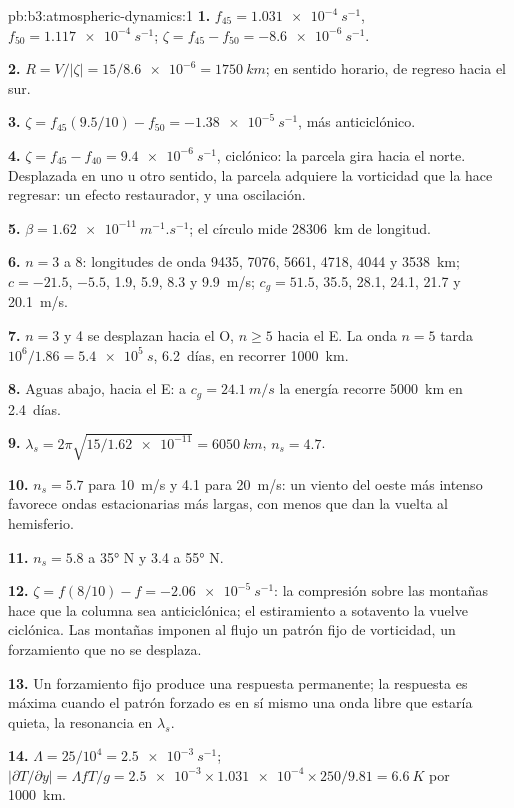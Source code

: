 \begin{solution}{pb:b3:atmospheric-dynamics:1}
\textbf{1.} $f_{45} = \qty{1.031e-4}{s^{-1}}$, $f_{50} =
\qty{1.117e-4}{s^{-1}}$; $\zeta = f_{45} - f_{50} = \qty{-8.6e-6}{s^{-1}}$.

\textbf{2.} $R = V/|\zeta| = 15/\num{8.6e-6} = \qty{1750}{km}$; en sentido horario,
de regreso hacia el sur.

\textbf{3.} $\zeta = f_{45}(9.5/10) - f_{50} = \qty{-1.38e-5}{s^{-1}}$, más
anticiclónico.

\textbf{4.} $\zeta = f_{45} - f_{40} = \qty{+9.4e-6}{s^{-1}}$, ciclónico: la parcela
gira hacia el norte. Desplazada en uno u otro sentido, la parcela adquiere la vorticidad
que la hace regresar: un efecto restaurador, y una oscilación.

\textbf{5.} $\beta = \qty{1.62e-11}{m^{-1}.s^{-1}}$; el círculo mide
\qty{28306}{km} de longitud.

\textbf{6.} $n = 3$ a 8: longitudes de onda 9435, 7076, 5661, 4718, 4044 y
\qty{3538}{km}; $c = -21.5$, $-5.5$, 1.9, 5.9, 8.3 y \qty{9.9}{m/s}; $c_g
= 51.5$, 35.5, 28.1, 24.1, 21.7 y \qty{20.1}{m/s}.

\textbf{7.} $n = 3$ y 4 se desplazan hacia el O, $n \ge 5$ hacia el E. La onda $n = 5$ tarda
$10^6/1.86 = \qty{5.4e5}{s}$, \num{6.2}~días, en recorrer \qty{1000}{km}.

\textbf{8.} Aguas abajo, hacia el E: a $c_g = \qty{24.1}{m/s}$ la energía recorre
\qty{5000}{km} en \num{2.4}~días.

\textbf{9.} $\lambda_s = 2\pi\sqrt{15/\num{1.62e-11}} = \qty{6050}{km}$,
$n_s = 4.7$.

\textbf{10.} $n_s = 5.7$ para \qty{10}{m/s} y 4.1 para \qty{20}{m/s}: un
viento del oeste más intenso favorece ondas estacionarias más largas, con menos
que dan la vuelta al hemisferio.

\textbf{11.} $n_s = 5.8$ a \ang{35} N y 3.4 a \ang{55} N.

\textbf{12.} $\zeta = f(8/10) - f = \qty{-2.06e-5}{s^{-1}}$: la compresión sobre
las montañas hace que la columna sea anticiclónica; el estiramiento a sotavento
la vuelve ciclónica. Las montañas imponen al flujo un patrón fijo de vorticidad,
un forzamiento que no se desplaza.

\textbf{13.} Un forzamiento fijo produce una respuesta permanente; la respuesta es
máxima cuando el patrón forzado es en sí mismo una onda libre que estaría
quieta, la resonancia en $\lambda_s$.

\textbf{14.} $\Lambda = 25/10^4 = \qty{2.5e-3}{s^{-1}}$;
$|\partial T/\partial y| = \Lambda fT/g = \num{2.5e-3}\times\num{1.031e-4}
\times250/9.81 = \qty{6.6}{K}$ por \qty{1000}{km}.


\end{solution}
